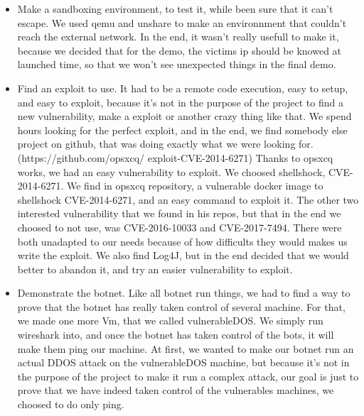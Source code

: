 \documentclass[../main.tex]{subfiles}
\begin{document}
    \begin{itemize}

        \item Make a sandboxing environment, to test it, while been sure that it can't escape. 
        We used qemu and unshare to make an environnment that couldn't reach the external network.
        In the end, it wasn't really usefull to make it, because we decided that for the demo, the victims ip should be knowed at launched time, so that we won't see unexpected things in the final demo. 

        \item Find an exploit to use. 
        It had to be a remote code execution, easy to setup, and easy to exploit, because it's not in the purpose of the project to find a new vulnerability, make a exploit or another crazy thing like that.
        We spend hours looking for the perfect exploit, and in the end, we find somebody else project on github, that was doing exactly what we were looking for.
        (https://github.com/opsxcq/
        exploit-CVE-2014-6271)
        Thanks to opsxcq works, we had an easy vulnerability to exploit.
        We choosed shellshock, CVE-2014-6271.
        We find in opsxcq repository, a vulnerable docker image to shellshock CVE-2014-6271, and an easy command to exploit it.
        The other two interested vulnerability that we found in his repos, but that in the end we choosed to not use, was CVE-2016-10033 and CVE-2017-7494.
        There were both unadapted to our needs because of how difficults they would makes us write the exploit.
        We also find Log4J, but in the end decided that we would better to abandon it, and try an easier vulnerability to exploit.

        \item Demonstrate the botnet.
        Like all botnet run things, we had to find a way to prove that the botnet has really taken control of several machine.
        For that, we made one more Vm, that we called vulnerableDOS. We simply run wireshark into, and once the botnet has taken control of the bots, it will make them ping our machine.
        At first, we wanted to make our botnet run an actual DDOS attack on the vulnerableDOS machine, but because it's not in the purpose of the project to make it run a complex attack, our goal is just to prove that we have indeed taken control of the vulnerables machines, we choosed to do only ping.

    \end{itemize}
\end{document}
